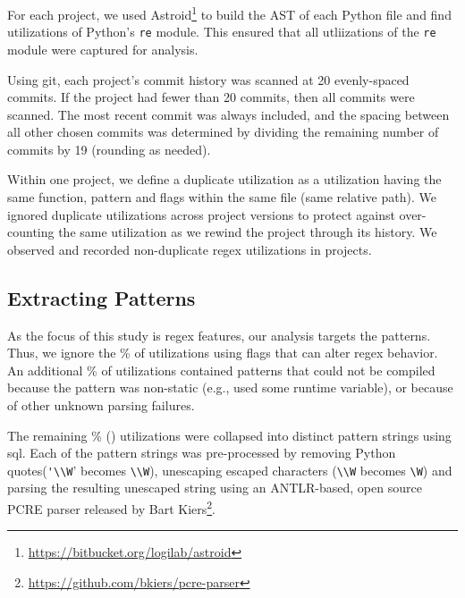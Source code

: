 For each project, we used Astroid\footnote{\url{https://bitbucket.org/logilab/astroid}} to build the AST of each Python file and find utilizations of Python's {\tt re} module. This ensured that all utliizations of the {\tt re} module were captured for analysis.

Using git, each project's commit history was scanned at 20 evenly-spaced commits.  If the project had fewer than 20 commits, then all commits were scanned.  The most recent commit was always included, and the spacing between all other chosen commits was determined by dividing the remaining number of commits by 19 (rounding as needed).

Within one project, we define a duplicate utilization as a utilization having the same function, pattern and flags within the same file (same relative path).  We ignored duplicate utilizations across project versions to protect against over-counting the same utilization as we rewind the project through its history.  We observed and recorded  non-duplicate regex utilizations in  projects.

\subsection{Extracting Patterns}
As the focus of this study is regex features, our analysis targets the patterns. Thus,  we ignore the \%  of utilizations using flags that can alter regex behavior.  An additional \% of utilizations contained patterns that could not be compiled because the pattern was non-static (e.g., used some runtime variable), or because of other unknown parsing failures.

The remaining \% () utilizations were collapsed into  distinct pattern strings using sql.  Each of the pattern strings was pre-processed by removing Python quotes(\verb!'\\W!' becomes \verb!\\W!), unescaping escaped characters (\verb!\\W! becomes \verb!\W!) and parsing the resulting unescaped string using an ANTLR-based, open source PCRE parser released by Bart Kiers\footnote{\url{https://github.com/bkiers/pcre-parser}}.

